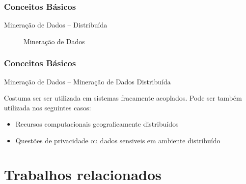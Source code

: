 \documentclass[hyperref={pdfpagelabels=false}]{beamer}
\begin{document}
\begin{frame}
	\frametitle{Conceitos Básicos}
    
    \Large{Mineração de Dados -- Distribuída}
    \begin{figure}
     \hfill
     \caption{Mineração de Dados}
     \end{figure}
     
\end{frame}


\begin{frame}

	\frametitle{Conceitos Básicos}
    
    \Large{Mineração de Dados -- Mineração de Dados Distribuída}\linebreak
    \normalsize
   
    Costuma ser ser utilizada em sistemas fracamente acoplados. \cite{goldschmidt2015data}
	\linebreak \linebreak Pode ser também utilizada nos seguintes casos: \cite{016-000} \begin{itemize}
    	\item Recursos computacionais geograficamente distribuídos
        \item Questões de privacidade ou dados sensiveis em ambiente distribuído
    \end{itemize}
\end{frame}


\section {Trabalhos relacionados}
\end{document}
